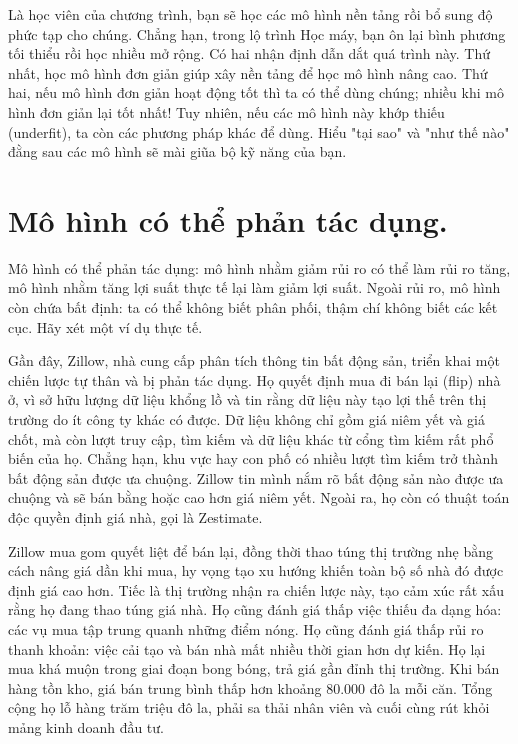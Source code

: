 Là học viên của chương trình, bạn sẽ học các mô hình nền tảng rồi bổ sung độ phức tạp cho chúng. Chẳng hạn, trong lộ trình Học máy, bạn ôn lại bình phương tối thiểu rồi học nhiều mở rộng. Có hai nhận định dẫn dắt quá trình này. Thứ nhất, học mô hình đơn giản giúp xây nền tảng để học mô hình nâng cao. Thứ hai, nếu mô hình đơn giản hoạt động tốt thì ta có thể dùng chúng; nhiều khi mô hình đơn giản lại tốt nhất! Tuy nhiên, nếu các mô hình này khớp thiếu (underfit), ta còn các phương pháp khác để dùng. Hiểu "tại sao" và "như thế nào" đằng sau các mô hình sẽ mài giũa bộ kỹ năng của bạn.

\section{Mô hình có thể phản tác dụng.}

Mô hình có thể phản tác dụng: mô hình nhằm giảm rủi ro có thể làm rủi ro tăng, mô hình nhằm tăng lợi suất thực tế lại làm giảm lợi suất. Ngoài rủi ro, mô hình còn chứa bất định: ta có thể không biết phân phối, thậm chí không biết các kết cục. Hãy xét một ví dụ thực tế.

Gần đây, Zillow, nhà cung cấp phân tích thông tin bất động sản, triển khai một chiến lược tự thân và bị phản tác dụng. Họ quyết định mua đi bán lại (flip) nhà ở, vì sở hữu lượng dữ liệu khổng lồ và tin rằng dữ liệu này tạo lợi thế trên thị trường do ít công ty khác có được. Dữ liệu không chỉ gồm giá niêm yết và giá chốt, mà còn lượt truy cập, tìm kiếm và dữ liệu khác từ cổng tìm kiếm rất phổ biến của họ. Chẳng hạn, khu vực hay con phố có nhiều lượt tìm kiếm trở thành bất động sản được ưa chuộng. Zillow tin mình nắm rõ bất động sản nào được ưa chuộng và sẽ bán bằng hoặc cao hơn giá niêm yết. Ngoài ra, họ còn có thuật toán độc quyền định giá nhà, gọi là Zestimate.

Zillow mua gom quyết liệt để bán lại, đồng thời thao túng thị trường nhẹ bằng cách nâng giá dần khi mua, hy vọng tạo xu hướng khiến toàn bộ số nhà đó được định giá cao hơn. Tiếc là thị trường nhận ra chiến lược này, tạo cảm xúc rất xấu rằng họ đang thao túng giá nhà. Họ cũng đánh giá thấp việc thiếu đa dạng hóa: các vụ mua tập trung quanh những điểm nóng. Họ cũng đánh giá thấp rủi ro thanh khoản: việc cải tạo và bán nhà mất nhiều thời gian hơn dự kiến. Họ lại mua khá muộn trong giai đoạn bong bóng, trả giá gần đỉnh thị trường. Khi bán hàng tồn kho, giá bán trung bình thấp hơn khoảng 80.000 đô la mỗi căn. Tổng cộng họ lỗ hàng trăm triệu đô la, phải sa thải nhân viên và cuối cùng rút khỏi mảng kinh doanh đầu tư.

